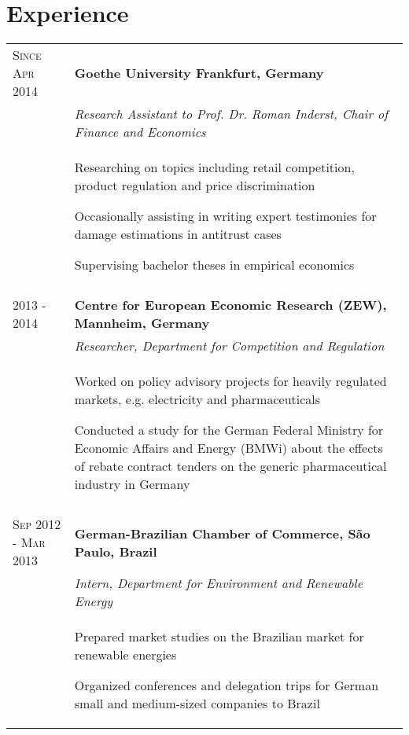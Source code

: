 \documentclass[a4paper,10pt]{article} %
\begin{document}
\section{Experience}


\begin{tabular}{P{4.5cm} P{10cm}}

\textsc{Since Apr 2014} & \textbf{Goethe University Frankfurt, Germany}\\
  & \emph{Research Assistant to Prof. Dr. Roman Inderst, Chair of Finance and Economics}\\ 
& \begin{itemize}\footnotesize{
\item Researching on topics including retail competition, product regulation and price discrimination
\item Occasionally assisting in writing expert testimonies for damage estimations in antitrust cases
\item Supervising bachelor theses in empirical economics
}
\end{itemize}\\
 \\



\textsc{2013 - 2014} &  \textbf{Centre for European Economic Research (ZEW), Mannheim, Germany} \\
 & \emph{Researcher, Department for Competition and Regulation} \\
& \begin{itemize}\footnotesize{
\item Worked on policy advisory projects for heavily regulated markets, e.g. electricity and pharmaceuticals
\item Conducted a study for the German Federal Ministry for Economic Affairs and Energy (BMWi) about the effects of rebate contract tenders on the generic pharmaceutical industry in Germany
}
\end{itemize}\\
 \\



\textsc{Sep 2012 - Mar 2013} &  \textbf{German-Brazilian Chamber of Commerce, S\~ao Paulo, Brazil}\\
 & \emph{Intern, Department for Environment and  Renewable Energy}\\
& \begin{itemize}\footnotesize{
\item Prepared market studies on the Brazilian market for renewable energies
\item Organized conferences and delegation trips for German small and medium-sized companies to Brazil
}
\end{itemize}\\ 
\end{tabular}
\end{document}
